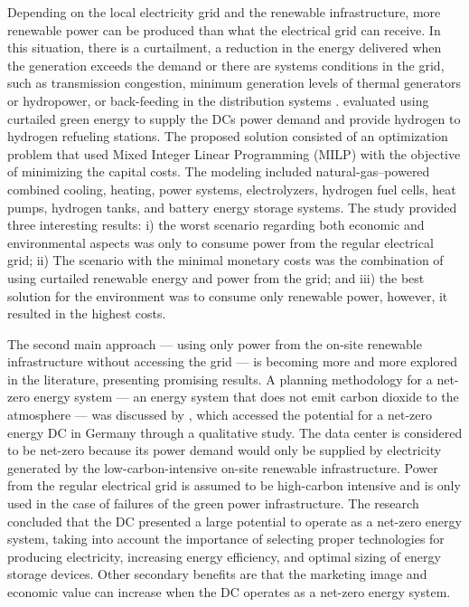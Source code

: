 Depending on the local electricity grid and the renewable infrastructure, more renewable power can be produced than what the electrical grid can receive. In this situation, there is a curtailment, a reduction in the energy delivered when the generation exceeds the demand or there are systems conditions in the grid, such as transmission congestion, minimum generation levels of thermal generators or hydropower, or back-feeding in the distribution systems \cite{curtailment_def_2021}. \citet{Niaz2022_curtailment} evaluated using curtailed green energy to supply the DCs power demand and provide hydrogen to hydrogen refueling stations. The proposed solution consisted of an optimization problem that used Mixed Integer Linear Programming (MILP) with the objective of minimizing the capital costs. The modeling included natural-gas–powered combined cooling, heating, power systems, electrolyzers, hydrogen fuel cells, heat pumps, hydrogen tanks, and battery energy storage systems. The study provided three interesting results: i) the worst scenario regarding both economic and environmental aspects was only to consume power from the regular electrical grid; ii) The scenario with the minimal monetary costs was the combination of using curtailed renewable energy and power from the grid; and iii) the best solution for the environment was to consume only renewable power, however, it resulted in the highest costs.

The second main approach --- using only power from the on-site renewable infrastructure without accessing the grid --- is becoming more and more explored in the literature, presenting promising results. A planning methodology for a net-zero energy system --- an energy system that does not emit carbon dioxide to the atmosphere \cite{netzero_energy_system} ---  was discussed by \citet{Richter2021_netzero_dcs}, which accessed the potential for a net-zero energy DC in Germany through a qualitative study. The data center is considered to be net-zero because its power demand would only be supplied by electricity generated by the low-carbon-intensive on-site renewable infrastructure. Power from the regular electrical grid is assumed to be high-carbon intensive and is only used in the case of failures of the green power infrastructure. The research concluded that the DC presented a large potential to operate as a net-zero energy system, taking into account the importance of selecting proper technologies for producing electricity, increasing energy efficiency, and optimal sizing of energy storage devices. Other secondary benefits are that the marketing image and economic value can increase when the DC operates as a net-zero energy system. 


